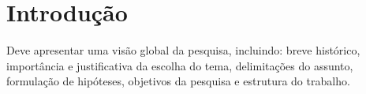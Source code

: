
\chapter{Introdução}\label{cap:introducao}

Deve apresentar uma visão global da pesquisa, incluindo: breve histórico, importância e justificativa da escolha do tema, delimitações do assunto, formulação de hipóteses, objetivos da pesquisa e estrutura do trabalho.
